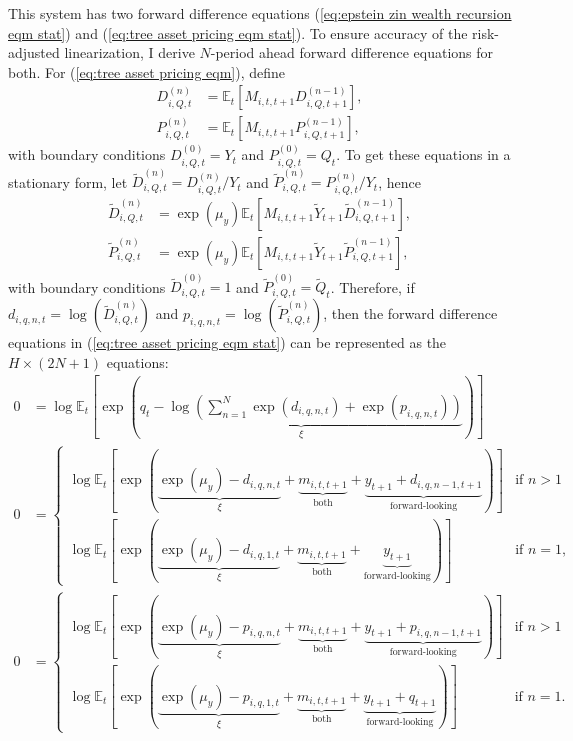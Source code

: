 \documentclass[12 pt, oneside]{article}
\theoremstyle{definition}
\theoremstyle{definition}
\theoremstyle{definition}
\newcommand{\E}{\mathbb{E}}
\begin{document}
This system has two forward difference equations (\ref{eq:epstein zin wealth recursion eqm stat}) and (\ref{eq:tree asset pricing eqm stat}). To ensure accuracy of the risk-adjusted linearization, I derive $N$-period ahead forward difference equations for both.
For (\ref{eq:tree asset pricing eqm}), define
\begin{align}
  D_{i, Q, t}^{(n)} & = \E_t[M_{i, t, t + 1} D_{i, Q, t + 1}^{(n - 1)}],\\
  P_{i, Q, t}^{(n)} & = \E_t[M_{i, t, t + 1} P_{i, Q, t + 1}^{(n - 1)}],
\end{align}
with boundary conditions $D_{i, Q, t}^{(0)} = Y_t$ and $P_{i, Q, t}^{(0)} = Q_t$. To get these equations in a stationary form, let $\tilde{D}_{i, Q, t}^{(n)} = D_{i, Q, t}^{(n)} / Y_t$ and $\tilde{P}_{i, Q, t}^{(n)} = P_{i, Q, t}^{(n)} / Y_t$, hence
\begin{align}
  \tilde{D}_{i, Q, t}^{(n)} & = \exp(\mu_y)\E_t[M_{i, t, t + 1} \tilde{Y}_{t + 1}\tilde{D}_{i, Q, t + 1}^{(n - 1)}],\\
  \tilde{P}_{i, Q, t}^{(n)} & = \exp(\mu_y)\E_t[M_{i, t, t + 1} \tilde{Y}_{t + 1}\tilde{P}_{i, Q, t + 1}^{(n - 1)}],
\end{align}
with boundary conditions $\tilde{D}_{i, Q, t}^{(0)} = 1$ and $\tilde{P}_{i, Q, t}^{(0)} = \tilde{Q}_t$.
Therefore, if $d_{i, q, n, t} = \log(\tilde{D}_{i, Q, t}^{(n)})$ and $p_{i, q, n, t} = \log(\tilde{P}_{i, Q, t}^{(n)})$, then the forward difference equations in (\ref{eq:tree asset pricing eqm stat}) can be represented as the $H \times (2N + 1)$ equations:
\begin{align}
  0 & = \log\E_t\left[\exp\left(\underbrace{q_t - \log\left(\sum_{n = 1}^{N}\exp(d_{i, q, n, t}) + \exp(p_{i, q, n, t})\right)}_{\xi}\right)\right]\\
  0 & =
      \begin{cases}
        \log\E_t\left[\exp\left(\underbrace{\exp(\mu_y) - d_{i, q, n, t}}_{\xi} + \underbrace{m_{i, t, t + 1}}_{\text{both}} + \underbrace{y_{t + 1} +  d_{i, q, n - 1, t + 1}}_{\text{forward-looking}}\right)\right] & \text{if } n > 1\\
        \log\E_t\left[\exp\left(\underbrace{\exp(\mu_y) - d_{i, q, 1, t}}_{\xi} + \underbrace{m_{i, t, t + 1}}_{\text{both}} + \underbrace{y_{t + 1}}_{\text{forward-looking}} \right)\right] & \text{if } n = 1,
      \end{cases}\\
  0 & =
      \begin{cases}
        \log\E_t\left[\exp\left(\underbrace{\exp(\mu_y) - p_{i, q, n, t}}_{\xi} + \underbrace{m_{i, t, t + 1}}_{\text{both}} + \underbrace{y_{t + 1} + p_{i, q, n - 1, t + 1}}_{\text{forward-looking}} \right)\right] & \text{if } n > 1\\
        \log\E_t\left[\exp\left(\underbrace{\exp(\mu_y) - p_{i, q, 1, t}}_{\xi} + \underbrace{m_{i, t, t + 1}}_{\text{both}} + \underbrace{y_{t + 1} + q_{t + 1}}_{\text{forward-looking}}\right)\right] & \text{if }n = 1.
      \end{cases}
\end{align}
\end{document}
